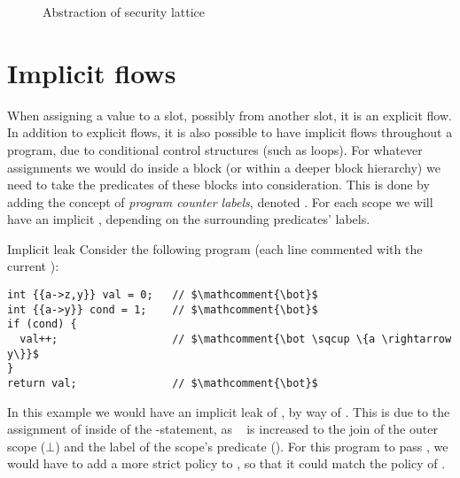 \begin{figure}
  \begin{center}
  \caption{Abstraction of security lattice}
  \label{dlm:lattice_fig}
  \end{center}
\end{figure}

\section{Implicit flows}\label{dlm:implicit_flows}
When assigning a value to a slot, possibly from another slot, it is an explicit flow.
In addition to explicit flows, it is also possible to have implicit flows throughout a program, due to conditional control structures (such as loops).
For whatever assignments we would do inside a block (or within a deeper block hierarchy) we need to take the predicates of these blocks into consideration.
This is done by adding the concept of \emph{program counter labels}, denoted \dlmpc.
For each scope we will have an implicit \dlmpc, depending on the surrounding predicates' labels.

\begin{example}{Implicit leak}\label{dlm:ex:implicit_leak}
  Consider the following program (each line commented with the current \dlmpc):
  \begin{lstlisting}[style=dlmc]
int {{a->z,y}} val = 0;   // $\mathcomment{\bot}$
int {{a->y}} cond = 1;    // $\mathcomment{\bot}$
if (cond) {
  val++;                  // $\mathcomment{\bot \sqcup \{a \rightarrow y\}}$
}
return val;               // $\mathcomment{\bot}$
  \end{lstlisting}
  In this example we would have an implicit leak of , by way of .
  This is due to the assignment of  inside of the -statement, as \dlmpc~ is increased to the join of the outer scope ($\bot$) and the label of the scope's predicate ().
  For this program to pass \thetool, we would have to add a more strict policy to , so that it could match the policy of .
\end{example}

